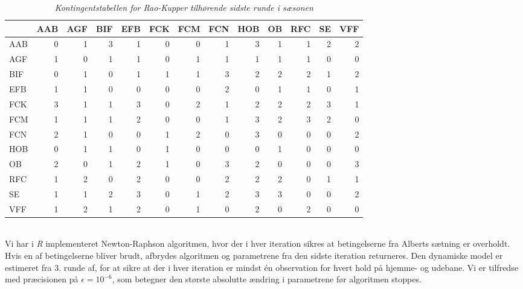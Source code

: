 \documentclass[11pt,a4paper]{article}
\begin{document}
\begin{table}[ht]
\centering
\begin{adjustbox}{max width=\textwidth}
\begin{tabular}{|l|rrrrrrrrrrrr|}
  \hline
 & AAB & AGF & BIF & EFB & FCK & FCM & FCN & HOB & OB & RFC & SE & VFF \\ 
  \hline
AAB &   0 &   1 &   3 &   1 &   0 &   0 &   1 &   3 &   1 &   1 &   2 &   2 \\ 
  AGF &   1 &   0 &   1 &   1 &   0 &   1 &   1 &   1 &   1 &   1 &   0 &   0 \\ 
  BIF &   0 &   1 &   0 &   1 &   1 &   1 &   3 &   2 &   2 &   2 &   1 &   2 \\ 
  EFB &   1 &   1 &   0 &   0 &   0 &   0 &   2 &   0 &   1 &   1 &   0 &   1 \\ 
  FCK &   3 &   1 &   1 &   3 &   0 &   2 &   1 &   2 &   2 &   2 &   3 &   1 \\ 
  FCM &   1 &   1 &   1 &   2 &   0 &   0 &   1 &   3 &   2 &   3 &   2 &   0 \\ 
  FCN &   2 &   1 &   0 &   0 &   1 &   2 &   0 &   3 &   0 &   0 &   0 &   2 \\ 
  HOB &   0 &   1 &   1 &   0 &   1 &   0 &   0 &   0 &   1 &   0 &   0 &   0 \\ 
  OB &   2 &   0 &   1 &   2 &   1 &   0 &   3 &   2 &   0 &   0 &   0 &   3 \\ 
  RFC &   1 &   2 &   0 &   2 &   0 &   0 &   2 &   2 &   2 &   0 &   1 &   1 \\ 
  SE &   1 &   1 &   2 &   3 &   0 &   1 &   2 &   3 &   3 &   0 &   0 &   2 \\ 
  VFF &   1 &   2 &   1 &   2 &   0 &   1 &   0 &   2 &   0 &   2 &   0 &   0 \\ 
   \hline
\end{tabular}
\end{adjustbox}
\caption{\label{tab:Kontingentstabel}\textit{Kontingentstabellen for Rao-Kupper tilhørende sidste runde i sæsonen}}
\end{table}
\\Vi har i \textit{R} implementeret Newton-Raphson algoritmen, hvor der i hver iteration sikres at betingelserne fra Alberts sætning er overholdt. Hvis en af betingelserne bliver brudt, afbrydes algoritmen og parametrene fra den sidste iteration returneres. Den dynamiske model er estimeret fra 3. runde af, for at sikre at der i hver iteration er mindst én observation for hvert hold på hjemme- og udebane. Vi er tilfredse med præcisionen på $\epsilon = 10^{-6}$, som betegner den største absolutte ændring i parametrene før algoritmen stoppes.
\end{document}

